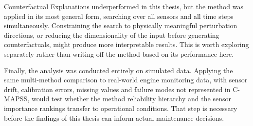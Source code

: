 Counterfactual Explanations underperformed in this thesis, but the method was applied in its most general form, searching over all sensors and all time steps simultaneously. Constraining the search to physically meaningful perturbation directions, or reducing the dimensionality of the input before generating counterfactuals, might produce more interpretable results. This is worth exploring separately rather than writing off the method based on its performance here.

Finally, the analysis was conducted entirely on simulated data. Applying the same multi-method comparison to real-world engine monitoring data, with sensor drift, calibration errors, missing values and failure modes not represented in C-MAPSS, would test whether the method reliability hierarchy and the sensor importance rankings transfer to operational conditions. That step is necessary before the findings of this thesis can inform actual maintenance decisions.
